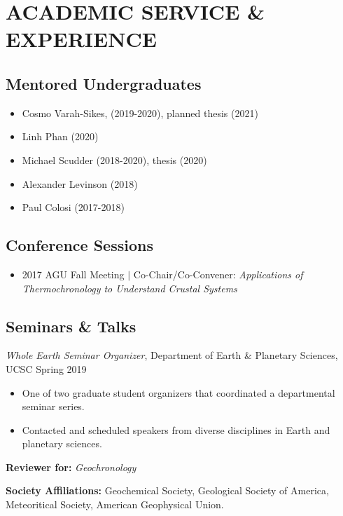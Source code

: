 \documentclass[10pt]{article}
\begin{document}

\section*{ACADEMIC SERVICE \& EXPERIENCE}

\subsection*{\textbf{Mentored Undergraduates}}
\begin{itemize}
		\item Cosmo Varah-Sikes, (2019-2020), planned thesis (2021)
		\item Linh Phan (2020)
		\item Michael Scudder (2018-2020), thesis (2020)
		\item Alexander Levinson (2018)
		\item Paul Colosi (2017-2018)
\end{itemize}

\subsection*{\textbf{Conference Sessions}}
\begin{itemize}
	\item 2017 AGU Fall Meeting $|$ Co-Chair/Co-Convener: \textit{Applications of Thermochronology to Understand Crustal Systems}
\end{itemize}

\subsection*{\textbf{Seminars \& Talks}}
\textit{Whole Earth Seminar Organizer}, Department of Earth \& Planetary Sciences, UCSC \hfill  Spring 2019
\begin{itemize}
	\item One of two graduate student organizers that coordinated a departmental seminar series.
	\item Contacted and scheduled speakers from diverse disciplines in Earth and planetary sciences.
\end{itemize}

\vspace{2ex}
\begin{hangparas}{5ex}{1}
	\textbf{Reviewer for:} \textit{Geochronology}

	\vspace{2ex}
	\textbf{Society Affiliations:} Geochemical Society, Geological Society of America, Meteoritical Society, American Geophysical Union.
\end{hangparas}
\end{document}
